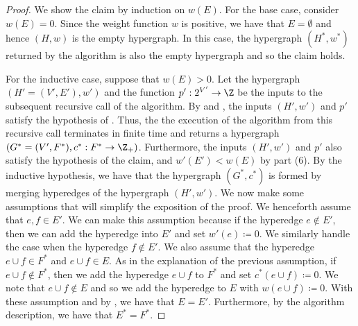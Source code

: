 \iffalse
\begin{proof}
    We show the claim by induction on $w(E)$. For the base case, consider $w(E) = 0$. Since the weight function $w$ is positive, we have that $E = \emptyset$ and hence $(H, w)$ is the empty hypergraph. In this case, the hypergraph $(H^*, w^*)$ returned by the algorithm is also the empty hypergraph and so the claim holds. 

    For the inductive case, suppose that $w(E) > 0$. Let the hypergraph $(H' = (V', E'), w')$ and the function $p':2^{V'}\rightarrow\Z$ be the inputs to the subsequent recursive call of the algorithm. By  and , the inputs $(H',w')$ and $p'$ satisfy the hypothesis of . Thus, the the execution of the algorithm from this recursive call terminates in finite time and returns a hypergraph $(G^* = (V', F^*), c^*:F^*\rightarrow\Z_+)$. Furthermore, the inputs 
$(H', w')$ and $p'$ also satisfy the hypothesis of the claim, and $w'(E') < w(E)$ by  part (6). By the inductive hypothesis, we have that the hypergraph $(G^*, c^*)$ is formed by merging hyperedges of the hypergraph $(H', w')$. We now make some assumptions that will simplify the exposition of the proof. We henceforth assume that  $e, f \in E'$. We can make this assumption because if the hyperedge $e \not \in E'$, then we can add the hyperedge into $E'$ and set $w'(e) \coloneqq  0$. We similarly handle the case when the hyperedge $f \not \in E'$. We also assume that the hyperedge $e \cup f \in F^*$ and $e \cup f \in E$. As in the explanation of the previous assumption, if $e\cup f \not \in F^*$, then we add the hyperedge $e \cup f$ to $F^*$ and set $c^*(e\cup f) \coloneqq  0$. We note that $e\cup f \not \in E$ and so we add the hyperedge to $E$ with $w(e\cup f) \coloneqq  0$. With these assumption and by , we have that $E = E'$. Furthermore, by the algorithm description, we have that  $E^* = F^*$. 


\end{proof}

